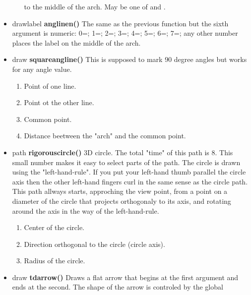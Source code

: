 \begin{itemize}
\begin{enumerate}
to the middle of the arch. May
be one of  and .
\end{enumerate}
\item drawlabel {\bfseries anglinen()}
The same as the previous function but the
sixth argument is numeric:
0=;
1=;
2=;
3=;
4=;
5=;
6=;
7=;
any other number places the label
on the middle of the arch.
\item draw {\bfseries squareangline()}
This is supposed to mark 90 degree angles
but works for any angle value.
\begin{enumerate}
\item {} Point of one line.
\item {} Point ot the other line.
\item {} Common point.
\item {} Distance beetween the "arch"
and the common point.
\end{enumerate}
\item path {\bfseries rigorouscircle()}
3D circle. The total "time" of this path is 8. This
small number makes it easy to select parts of the
path. The circle is drawn using the
"left-hand-rule". If you put your left-hand thumb
parallel the circle axis then the other left-hand
fingers curl in the same sense as the circle
path. This path allways starts, approching the view
point, from a point on a diameter of the
circle that projects orthogonaly to its axis, and
rotating around the axis in the way of the left-hand-rule.
\begin{enumerate}
\item {} Center of the circle.
\item {} Direction orthogonal to the
circle (circle axis).
\item {} Radius of the circle.
\end{enumerate}
\item draw {\bfseries tdarrow()} Draws a flat arrow that
begins at the first argument and ends at the second.
The shape of the arrow is controled by the global

\end{itemize}

